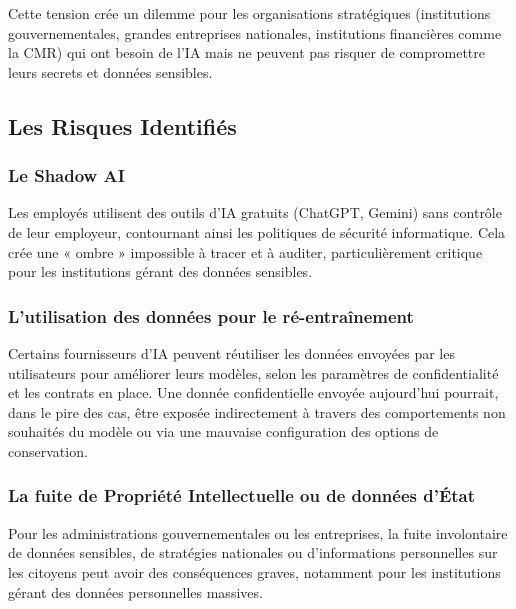 \documentclass[12pt, a4paper]{report}
\begin{document}
Cette tension crée un dilemme pour les organisations stratégiques
(institutions gouvernementales, grandes entreprises nationales,
institutions financières comme la CMR) qui ont besoin de l'IA mais ne
peuvent pas risquer de compromettre leurs secrets et données sensibles.

\subsection{Les Risques Identifiés}

\subsubsection{Le Shadow AI}

Les employés utilisent des outils d'IA gratuits (ChatGPT, Gemini) sans
contrôle de leur employeur, contournant ainsi les politiques de sécurité
informatique. Cela crée une « ombre » impossible à tracer et à auditer,
particulièrement critique pour les institutions gérant des données
sensibles.

\subsubsection{L'utilisation des données pour le ré-entraînement}

Certains fournisseurs d'IA peuvent réutiliser les données envoyées par
les utilisateurs pour améliorer leurs modèles, selon les paramètres de
confidentialité et les contrats en place. Une donnée confidentielle
envoyée aujourd'hui pourrait, dans le pire des cas, être exposée
indirectement à travers des comportements non souhaités du modèle ou
via une mauvaise configuration des options de conservation.

\subsubsection{La fuite de Propriété Intellectuelle ou de données d'État}

Pour les administrations gouvernementales ou les entreprises, la fuite
involontaire de données sensibles, de stratégies nationales ou
d'informations personnelles sur les citoyens peut avoir des conséquences
graves, notamment pour les institutions gérant des données personnelles
massives.

\newpage

\end{document}
